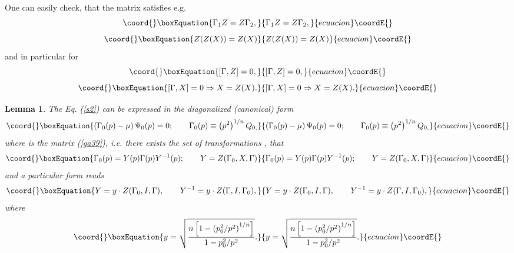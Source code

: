 \documentclass[a4paper,a4paper]{article}
\newtheorem{lemma}[theorem]{Lemma}
\begin{document}
\noindent One can easily check, that the matrix \coordHE{} satisfies e.g. 
\begin{equation}\coord{}\boxEquation{
\Gamma _{1}Z=Z\Gamma _{2},  \label{s23}
}{
\Gamma _{1}Z=Z\Gamma _{2},  }{ecuacion}\coordE{}\end{equation}%
\begin{equation}\coord{}\boxEquation{
Z(Z(X))=Z(X)  \label{s24}
}{
Z(Z(X))=Z(X)  }{ecuacion}\coordE{}\end{equation}%
and in particular for \coordHE{}%
\begin{equation}\coord{}\boxEquation{
\lbrack \Gamma ,Z]=0,  \label{s25}
}{
\lbrack \Gamma ,Z]=0,  }{ecuacion}\coordE{}\end{equation}%
\begin{equation}\coord{}\boxEquation{
\lbrack \Gamma ,X]=0\Rightarrow X=Z(X).  \label{sa25}
}{
\lbrack \Gamma ,X]=0\Rightarrow X=Z(X).  }{ecuacion}\coordE{}\end{equation}

\begin{lemma}
\label{le4} The Eq. (\ref{s2}) can be expressed in the diagonalized
(canonical) form 
\begin{equation}\coord{}\boxEquation{
\left( \Gamma _{0}(p)-\mu \right) \Psi _{0}(p)=0;\mathbf{\qquad }\Gamma
_{0}(p)\equiv \left( p^{2}\right) ^{1/n}Q_{0,}  \label{s26}
}{
\left( \Gamma _{0}(p)-\mu \right) \Psi _{0}(p)=0;\mathbf{\qquad }\Gamma
_{0}(p)\equiv \left( p^{2}\right) ^{1/n}Q_{0,}  }{ecuacion}\coordE{}\end{equation}%
where \coordHE{} is the matrix (\ref{ga39}), i.e. there exists the set of
transformations \coordHE{}, that 
\begin{equation}\coord{}\boxEquation{
\Gamma _{0}(p)=Y(p)\Gamma (p)Y^{-1}(p);\qquad Y=Z(\Gamma _{0},X,\Gamma )
\label{s27}
}{
\Gamma _{0}(p)=Y(p)\Gamma (p)Y^{-1}(p);\qquad Y=Z(\Gamma _{0},X,\Gamma )
}{ecuacion}\coordE{}\end{equation}%
and a particular form reads 
\begin{equation}\coord{}\boxEquation{
Y=y\cdot Z(\Gamma _{0},I,\Gamma ),\mathbf{\qquad }Y^{-1}=y\cdot Z(\Gamma
,I,\Gamma _{0}),  \label{sa27}
}{
Y=y\cdot Z(\Gamma _{0},I,\Gamma ),\mathbf{\qquad }Y^{-1}=y\cdot Z(\Gamma
,I,\Gamma _{0}),  }{ecuacion}\coordE{}\end{equation}%
where%
\begin{equation*}\coord{}\boxEquation{
y=\sqrt{\frac{n\left[ 1-\left( p_{0}^{2}/p^{2}\right) ^{1/n}\right] }{
1-p_{0}^{2}/p^{2}}}.
}{
y=\sqrt{\frac{n\left[ 1-\left( p_{0}^{2}/p^{2}\right) ^{1/n}\right] }{
1-p_{0}^{2}/p^{2}}}.
}{ecuacion}\coordE{}\end{equation*}
\end{lemma}
\end{document}
